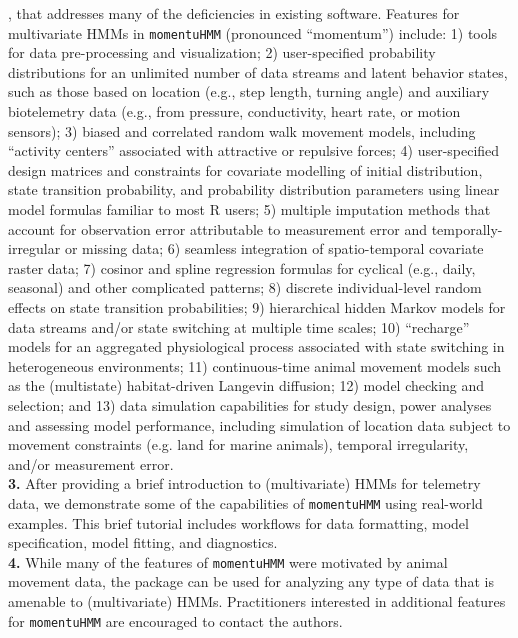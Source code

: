 \documentclass[12pt]{article}\usepackage[]{graphicx}\usepackage[]{xcolor}
\begin{document}
, that addresses many of the deficiencies in existing software.  Features for multivariate HMMs in \verb|momentuHMM| (pronounced ``momentum'') include: 1) tools for data pre-processing and visualization; 2) user-specified probability distributions for an unlimited number of data streams and latent behavior states, such as those based on location (e.g., step length, turning angle) and auxiliary biotelemetry data (e.g., from pressure, conductivity, heart rate, or motion sensors); 3) biased and correlated random walk movement models, including ``activity centers'' associated with attractive or repulsive forces; 4) user-specified design matrices and constraints for covariate modelling of initial distribution, state transition probability, and probability distribution parameters using linear model formulas familiar to most R users; 5) multiple imputation methods that account for observation error attributable to measurement error and temporally-irregular or missing data; 6) seamless integration of spatio-temporal covariate raster data; 7) cosinor and spline regression formulas for cyclical (e.g., daily, seasonal) and other complicated patterns; 8) discrete individual-level random effects on state transition probabilities; 9) hierarchical hidden Markov models for data streams and/or state switching at multiple time scales; 10) ``recharge'' models for an aggregated physiological process associated with state switching in heterogeneous environments; 11) continuous-time animal movement models such as the (multistate) habitat-driven Langevin diffusion; 12) model checking and selection; and 13) data simulation capabilities for study design, power analyses and assessing model performance, including simulation of location data subject to movement constraints (e.g. land for marine animals), temporal irregularity, and/or measurement error.\\ 
\textbf{3.} After providing a brief introduction to (multivariate) HMMs for telemetry data, we demonstrate some of the capabilities of \verb|momentuHMM| using real-world examples. This brief tutorial includes workflows for data formatting, model specification, model fitting, and diagnostics.\\
\textbf{4.} While many of the features of \verb|momentuHMM| were motivated by animal movement data, the package can be used for analyzing any type of data that is amenable to (multivariate) HMMs. Practitioners interested in additional features for \verb|momentuHMM| are encouraged to contact the authors.\\
\end{document}
